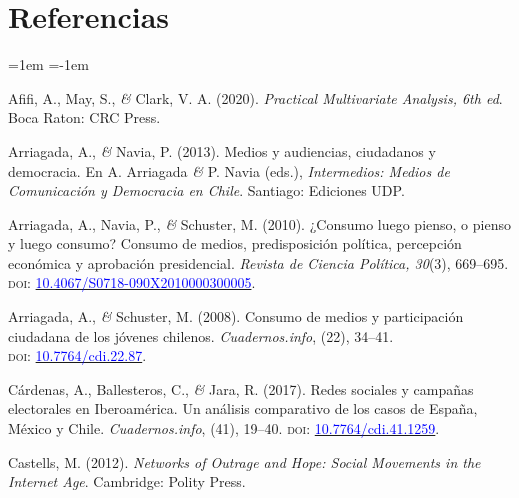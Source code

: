 \documentclass[a4paper]{tufte-handout}
\begin{document}



\section{{\normalfont Referencias}}


\begin{list}{}%
{\leftmargin=1em \itemindent=-1em}

\item{\small Afifi, A., May, S., {\itshape \&} Clark, V. A. (2020). {\itshape Practical Multivariate Analysis, 6th ed}. Boca Raton: CRC Press.}

\item{\small Arriagada, A., {\itshape \&} Navia, P. (2013). Medios y audiencias, ciudadanos y democracia. En A. Arriagada {\itshape \&} P. Navia (eds.), {\itshape Intermedios: Medios de Comunicación y Democracia en Chile}. Santiago: Ediciones UDP.}

\item{\small Arriagada, A., Navia, P., {\itshape \&} Schuster, M. (2010). ¿Consumo luego pienso, o pienso y luego consumo? Consumo de medios, predisposición política, percepción económica y aprobación presidencial. {\itshape Revista de Ciencia Política, 30}(3), 669--695. {\scshape doi:} \href{http://dx.doi.org/10.4067/S0718-090X2010000300005}{\textcolor{blue}{10.4067/S0718-090X2010000300005}}.}

\item{\small Arriagada, A., {\itshape \&} Schuster, M. (2008). Consumo de medios y participación ciudadana de los jóvenes chilenos. {\itshape Cuadernos.info}, (22), 34--41. \\ {\scshape doi:} \href{https://doi.org/10.7764/cdi.22.87}{\textcolor{blue}{10.7764/cdi.22.87}}.}

\item{\small Cárdenas, A., Ballesteros, C., {\itshape \&} Jara, R. (2017). Redes sociales y campañas electorales en Iberoamérica. Un análisis comparativo de los casos de España, México y Chile. {\itshape Cuadernos.info}, (41), 19--40. {\scshape doi:} \href{https://doi.org/10.7764/cdi.41.1259}{\textcolor{blue}{10.7764/cdi.41.1259}}.}

\item{\small Castells, M. (2012). {\itshape Networks of Outrage and Hope: Social Movements in the Internet Age}. Cambridge: Polity Press.}


\end{list}
\end{document}
